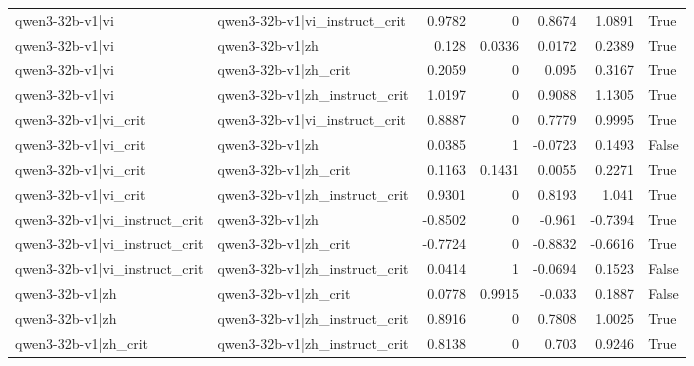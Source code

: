 \begin{table}
\begin{tabular}{l l r r r r l}
qwen3-32b-v1|vi & qwen3-32b-v1|vi_instruct_crit & 0.9782 & 0 & 0.8674 & 1.0891 & True \\
qwen3-32b-v1|vi & qwen3-32b-v1|zh & 0.128 & 0.0336 & 0.0172 & 0.2389 & True \\
qwen3-32b-v1|vi & qwen3-32b-v1|zh_crit & 0.2059 & 0 & 0.095 & 0.3167 & True \\
qwen3-32b-v1|vi & qwen3-32b-v1|zh_instruct_crit & 1.0197 & 0 & 0.9088 & 1.1305 & True \\
qwen3-32b-v1|vi_crit & qwen3-32b-v1|vi_instruct_crit & 0.8887 & 0 & 0.7779 & 0.9995 & True \\
qwen3-32b-v1|vi_crit & qwen3-32b-v1|zh & 0.0385 & 1 & -0.0723 & 0.1493 & False \\
qwen3-32b-v1|vi_crit & qwen3-32b-v1|zh_crit & 0.1163 & 0.1431 & 0.0055 & 0.2271 & True \\
qwen3-32b-v1|vi_crit & qwen3-32b-v1|zh_instruct_crit & 0.9301 & 0 & 0.8193 & 1.041 & True \\
qwen3-32b-v1|vi_instruct_crit & qwen3-32b-v1|zh & -0.8502 & 0 & -0.961 & -0.7394 & True \\
qwen3-32b-v1|vi_instruct_crit & qwen3-32b-v1|zh_crit & -0.7724 & 0 & -0.8832 & -0.6616 & True \\
qwen3-32b-v1|vi_instruct_crit & qwen3-32b-v1|zh_instruct_crit & 0.0414 & 1 & -0.0694 & 0.1523 & False \\
qwen3-32b-v1|zh & qwen3-32b-v1|zh_crit & 0.0778 & 0.9915 & -0.033 & 0.1887 & False \\
qwen3-32b-v1|zh & qwen3-32b-v1|zh_instruct_crit & 0.8916 & 0 & 0.7808 & 1.0025 & True \\
qwen3-32b-v1|zh_crit & qwen3-32b-v1|zh_instruct_crit & 0.8138 & 0 & 0.703 & 0.9246 & True \\
\bottomrule
\end{tabular}
\end{table}
